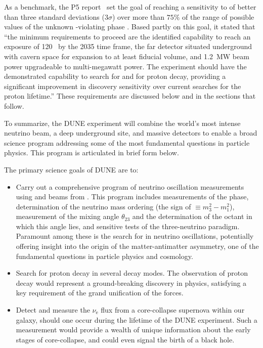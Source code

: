As a benchmark, the P5 report~\cite{p5report2014} set the goal of
reaching a sensitivity to  of better than three
standard deviations (\num{3}$\sigma$) over more than $75\%$
of the range of possible values of the unknown
-violating phase \deltacp.
Based partly on this goal, it stated that ``the
minimum requirements to proceed are the identified capability
to reach an exposure of \num{120}~\ktMWyr{} by the 2035 time
frame, the far detector situated underground with cavern space
for expansion to at least \fdfiducialmass \lar fiducial volume,
and \SI{1.2}{MW} beam power upgradeable to multi-megawatt power.
The experiment should have the demonstrated capability to
search for  and for proton decay, providing a
significant improvement in discovery sensitivity over current
searches for the proton lifetime.''
These requirements are discussed below and in the sections
that follow.

To summarize, the DUNE experiment will combine the world's most
intense neutrino beam, a deep underground site, and massive \lar
detectors to enable a broad science program addressing some of
the most fundamental questions in particle physics.
This program is articulated in brief form below.

The primary science goals of DUNE are to:
\begin{itemize}

\item Carry out a comprehensive program of neutrino oscillation measurements using
      \numu and \anumu beams from \fnal. This program includes measurements of
      the  phase, determination of the neutrino mass ordering
      (the sign of $ \equiv m_3^2-m_1^2$), measurement of the mixing
      angle $\theta_{23}$ and the determination of the octant in which this
      angle lies, and sensitive tests of the three-neutrino paradigm.
      Paramount among these is the search for  in neutrino oscillations, potentially offering 
      insight into the origin of the matter-antimatter asymmetry,
      one of the fundamental questions in particle physics and cosmology.

\item Search for proton decay in several %
decay modes.
      The observation of proton decay would represent a ground-breaking discovery
      in physics, satisfying a key requirement of the grand unification of the forces.

\item Detect and measure the $\nu_\text{e}$ flux from a core-collapse
      supernova within our galaxy, should one occur during the lifetime
      of the DUNE experiment. Such a measurement would provide a wealth
      of unique information about the early stages of core-collapse, and
      could even signal the birth of a black hole.

\end{itemize}

